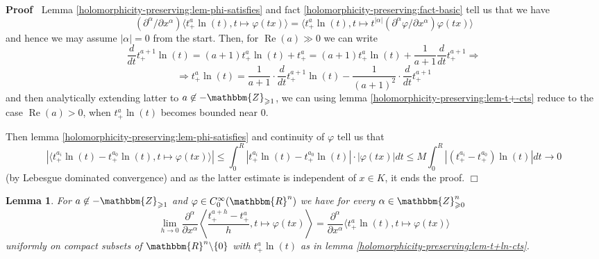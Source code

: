 \documentclass{article}
\newcommand{\nin}{\not\in}
\newcommand{\tmop}[1]{\ensuremath{\operatorname{#1}}}
\renewenvironment{proof}{\noindent\textbf{Proof\ }}{\hspace*{\fill}$\Box$\medskip}
\newtheorem{lemma}[proposition]{Lemma}
\theoremstyle{remark}
\begin{document}
\begin{proof}
  Lemma \ref{holomorphicity-preserving:lem-phi-satisfies} and fact
  \ref{holomorphicity-preserving:fact-basic} tell us that we have
  \[ (\partial^{\alpha} / \partial x^{\alpha}) \langle t_+^{a} \ln (t), t
     \mapsto \varphi (t x) \rangle = \langle t_+^{a} \ln (t), t \mapsto
     t^{| \alpha |} (\partial^{\alpha} \varphi / \partial x^{\alpha}) \varphi
     (t x) \rangle \]
  and hence we may assume $| \alpha | = 0$ from the start. Then, for
  $\tmop{Re} (a) \gg 0$ we can write
  \[ \frac{d}{d t} t_+^{a + 1} \ln (t) = (a + 1) t_+^a \ln (t) + t_+^a = (a +
     1) t_+^a \ln (t) + \frac{1}{a + 1} \frac{d}{d t} t_+^{a + 1} \Rightarrow
  \]
  \[ \Rightarrow t_+^a \ln (t) = \frac{1}{a + 1} \cdot \frac{d}{d t} t_+^{a +
     1} \ln (t) - \frac{1}{(a + 1)^2} \cdot \frac{d}{d t} t^{a + 1}_+ \]
  and then analytically extending latter to $a \nin -\mathbbm{Z}_{\geqslant
  1}$, we can using lemma \ref{holomorphicity-preserving:lem-t+-cts} reduce to
  the case $\tmop{Re} (a) > 0$, when $t_+^a \ln (t)$ becomes bounded near $0$.
  
  Then lemma \ref{holomorphicity-preserving:lem-phi-satisfies} and continuity
  of $\varphi$ tell us that
  \[ | \langle t_+^{a_i} \ln (t) - t_+^{a_0} \ln (t), t \mapsto \varphi (t x)
     \rangle | \leqslant \int_0^R | t_+^{a_i} \ln (t) - t_+^{a_0} \ln (t) |
     \cdot | \varphi (t x) | d t \leqslant M \int_0^R | (t_+^{a_i} -
     t_+^{a_0}) \ln (t) | d t \rightarrow 0 \]
  (by Lebesgue dominated convergence) and as the latter estimate is
  independent of $x \in K$, it ends the proof.
\end{proof}

\begin{lemma}
  \label{holomorphicity-preserving:lem-t+-smth-aux}For $a \nin
  -\mathbbm{Z}_{\geqslant 1}$ and $\varphi \in C_0^{\infty} (\mathbbm{R}^n)$
  we have for every $\alpha \in \mathbbm{Z}_{\geqslant 0}^n$
  \[ \lim_{h \rightarrow 0} \frac{\partial^{\alpha}}{\partial x^{\alpha}}
     \left\langle \frac{t_+^{a + h} - t_+^a}{h}, t \mapsto \varphi (t x)
     \right\rangle = \frac{\partial^{\alpha}}{\partial x^{\alpha}} \langle
     t_+^a \ln (t), t \mapsto \varphi (t x) \rangle \]
  uniformly on compact subsets of $\mathbbm{R}^n \backslash \{ 0 \}$ with
  $t_+^a \ln (t)$ as in lemma \ref{holomorphicity-preserving:lem-t+ln-cts}.
\end{lemma}
\end{document}
